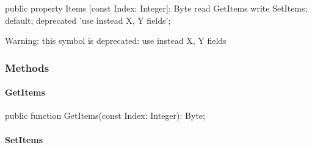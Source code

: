 \documentclass{report}
\begin{document}
\begin{list}{}{
\setlength{\itemindent}{0cm}
\setlength{\listparindent}{0cm}
\setlength{\leftmargin}{\evensidemargin}
\addtolength{\leftmargin}{\tmplength}
\settowidth{\labelsep}{X}
\addtolength{\leftmargin}{\labelsep}
\setlength{\labelwidth}{\tmplength}
}
\begin{flushleft}
\item[\textbf{Declaration}\hfill]
\begin{ttfamily}
public property Items [const Index: Integer]: Byte read GetItems write SetItems; default; deprecated 'use instead X, Y fields';\end{ttfamily}


\end{flushleft}
\par
\item[\textbf{Description}]
Warning: this symbol is deprecated: use instead X, Y fields

 

\end{list}
\subsubsection*{\large{\textbf{Methods}}\normalsize\hspace{1ex}\hfill}
\paragraph*{GetItems}\hspace*{\fill}

\begin{list}{}{
\setlength{\itemindent}{0cm}
\setlength{\listparindent}{0cm}
\setlength{\leftmargin}{\evensidemargin}
\addtolength{\leftmargin}{\tmplength}
\settowidth{\labelsep}{X}
\addtolength{\leftmargin}{\labelsep}
\setlength{\labelwidth}{\tmplength}
}
\begin{flushleft}
\item[\textbf{Declaration}\hfill]
\begin{ttfamily}
public function GetItems(const Index: Integer): Byte;\end{ttfamily}


\end{flushleft}
\end{list}
\paragraph*{SetItems}\hspace*{\fill}
\end{document}
